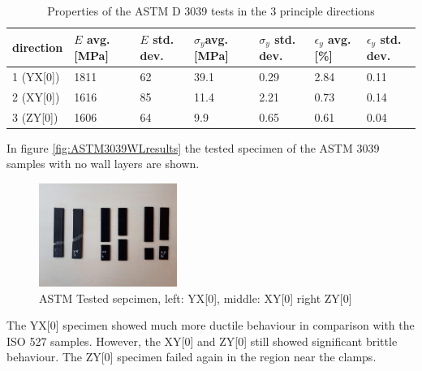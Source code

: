\begin{table}
\centering
\caption{Properties of the ASTM D 3039 tests in the 3 principle directions}
          \label{tab:ASTM3039results}
\begin{tabular}{ p{1.5cm}p{1cm}p{1cm}p{1cm}p{1cm}p{1cm}p{1cm}  }
\hline
direction & $E$ avg. [MPa] & $E$ std. dev. & $\sigma_y$avg. [MPa] & $\sigma_y$ std. dev. & $\epsilon_y$ avg. [\%] & $\epsilon_y$   std. dev. \\
 \hline
1 (YX[0]) & 1811 & 62 & 39.1 & 0.29 & 2.84 & 0.11 \\
2 (XY[0]) & 1616 & 85 & 11.4 & 2.21 & 0.73 & 0.14 \\
3 (ZY[0]) & 1606 & 64 & 9.9 & 0.65 & 0.61 & 0.04\\
 \hline
\end{tabular}
\end{table}

In figure \ref{fig:ASTM3039WLresults} the tested specimen of the ASTM 3039 samples with no wall layers are shown.
\begin{figure}[H]
    \centering
    \includegraphics[width=0.40\textwidth]{chapter_5_Experimentaltesting/figures/ImageASTM.jpg}
    \caption{ASTM Tested sepcimen, left: YX[0], middle: XY[0] right ZY[0]}
    \label{fig:ASTM3039specimen}
\end{figure}
The YX[0] specimen showed much more ductile behaviour in comparison with the ISO 527 samples. However, the XY[0] and ZY[0] still showed significant brittle behaviour. The ZY[0] specimen failed again in the region near the clamps.


